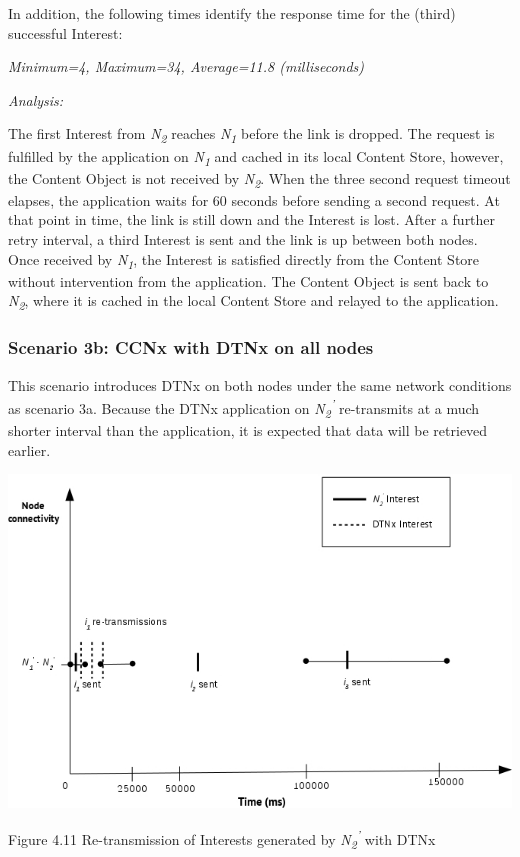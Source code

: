 \documentclass[a4paper,12pt]{report}      %
\begin{document}
In addition, the following times identify the response time for the (third) successful Interest:

\begin{center}\textsl{Minimum=4, Maximum=34, Average=11.8 (milliseconds)}\end{center}

\vspace*{1\baselineskip}\noindent\emph{Analysis:}

The first Interest from \emph{N\textsubscript{2}} reaches \emph{N\textsubscript{1}} before the link is dropped. The request is fulfilled by the application on \emph{N\textsubscript{1}} and cached in its local Content Store, however, the Content Object is not received by \emph{N\textsubscript{2}}. When the three second request timeout elapses, the application waits for 60 seconds before sending a second request. At that point in time, the link is still down and the Interest is lost. After a further retry interval, a third Interest is sent and the link is up between both nodes. Once received by \emph{N\textsubscript{1}}, the Interest is satisfied directly from the Content Store without intervention from the application. The Content Object is sent back to \emph{N\textsubscript{2}}, where it is cached in the local Content Store and relayed to the application.

\subsubsection{Scenario 3b: CCNx with DTNx on all nodes}

This scenario introduces DTNx on both nodes under the same network conditions as scenario 3a. Because the DTNx application on \emph{N\textsubscript{2}\textsuperscript{'}} re-transmits at a much shorter interval than the application, it is expected that data will be retrieved earlier.

\noindent\includegraphics[scale=0.55]{exp3b_timediag.jpg}\newline
\begin{center}Figure 4.11 Re-transmission of Interests generated by \emph{N\textsubscript{2}\textsuperscript{'}} with DTNx\end{center} 
\end{document}
